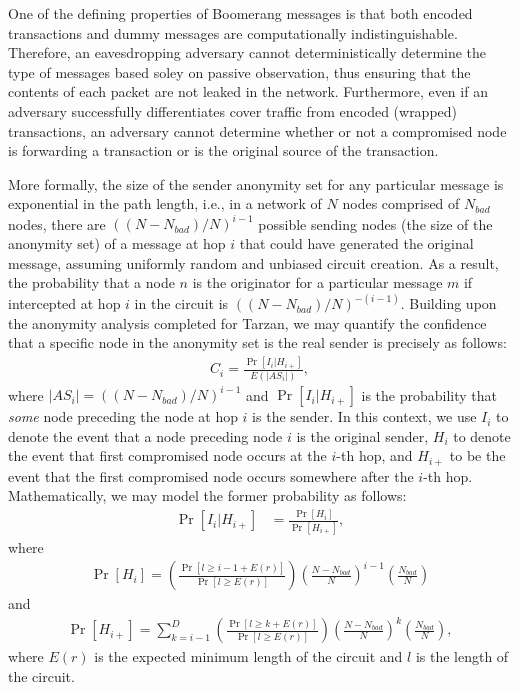 One of the defining properties of Boomerang messages is that both encoded transactions and dummy messages are computationally indistinguishable. Therefore, an eavesdropping adversary cannot deterministically determine the type of messages based soley on passive observation, thus ensuring that the contents of each packet are not leaked in the network. Furthermore, even if an adversary successfully differentiates cover traffic from encoded (wrapped) transactions, an adversary cannot determine whether or not a compromised node is forwarding a transaction or is the original source of the transaction.

More formally, the size of the sender anonymity set for any particular message is exponential in the path length, i.e., in a network of $N$ nodes comprised of $N_{bad}$ nodes, there are $((N - N_{bad}) / N)^{i-1}$ possible sending nodes (the size of the anonymity set) of a message at hop $i$ that could have generated the original message, assuming uniformly random and unbiased circuit creation. As a result, the probability that a node $n$ is the originator for a particular message $m$ if intercepted at hop $i$ in the circuit is $((N - N_{bad}) / N)^{-(i-1)}$. Building upon the anonymity analysis completed for Tarzan, we may quantify the confidence that a specific node in the anonymity set is the real sender is precisely as follows:
\begin{align*}
C_i = \frac{\Pr[I_i | H_{i+}]}{E(|AS_i|)},
\end{align*} 
where $|AS_i| = ((N - N_{bad}) / N)^{i-1}$ and $\Pr[I_i | H_{i+}]$ is the probability that \emph{some} node preceding the node at hop $i$ is the sender. In this context, we use $I_i$ to denote the event that a node preceding node $i$ is the original sender, $H_i$ to denote the event that first compromised node occurs at the $i$-th hop, and $H_{i+}$ to be the event that the first compromised node occurs somewhere after the $i$-th hop. Mathematically, we may model the former probability as follows:
\begin{align*}
\Pr[I_i | H_{i+}] & = \frac{\Pr[H_i]}{\Pr[H_{i+}]},
\end{align*}
where
\begin{align*}
\Pr[H_i] = \left( \frac{ \Pr[l \geq i - 1 + E(r)] } { \Pr[l \geq E(r)] }\right) \left(\frac{N - N_{bad}}{N}\right)^{i-1} \left( \frac{N_{bad}}{N}\right)
\end{align*}
and 
\begin{align*}
\Pr[H_{i+}] = \sum_{k=i-1}^{D} \left( \frac{ \Pr[l \geq k + E(r)] } { \Pr[l \geq E(r)] }\right) \left(\frac{N - N_{bad}}{N}\right)^{k} \left( \frac{N_{bad}}{N}\right),
\end{align*}
where $E(r)$ is the expected minimum length of the circuit and $l$ is the length of the circuit.

